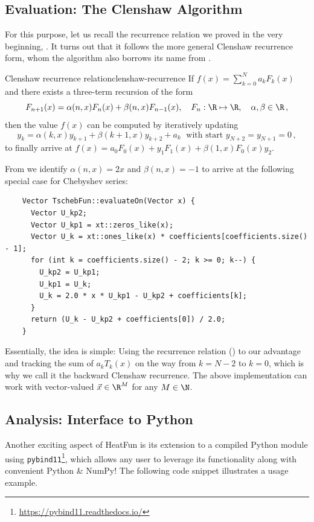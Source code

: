 \documentclass[12pt, a4paper]{article}
\newcommand{\chebyshev}{Chebyshev\xspace}
\newcommand{\heatfun}{\textcolor{themecolor3}{HeatFun}\xspace}
\begin{document}
  \subsection{Evaluation: The Clenshaw Algorithm}
  For this purpose, let us recall the recurrence relation we proved in the very beginning, .
  It turns out that it follows the more general Clenshaw recurrence form, whom the algorithm also borrows its name from \parencite[172-178]{art-of-sci-comp}.
  \begin{theorem}{Clenshaw recurrence relation}{clenshaw-recurrence}
    If $f(x) = \sum_{k=0}^N a_k F_k(x)$ and there exists a three-term recursion of the form
    $$F_{n+1}(x)=\alpha(n,x) F_n(x) + \beta(n,x) F_{n-1}(x),\quad F_n: \R \mapsto \R, \quad \alpha, \beta \in \R \,,$$
    then the value $f(x)$ can be computed by iteratively updating
    $$y_k = \alpha(k,x)y_{k+1}+\beta(k+1,x)y_{k+2}+a_k \; \text{ with start } y_{N+2} = y_{N+1} = 0\,,$$
    to finally arrive at $f(x) = a_0F_0(x)+y_1F_1(x)+\beta(1,x)F_0(x)y_2$.
  \end{theorem}

  From  we identify $\alpha(n, x) = 2x$ and $\beta(n, x) = -1$ to arrive at the following special case for \chebyshev series:
  \begin{verbatim}
    Vector TschebFun::evaluateOn(Vector x) {
      Vector U_kp2;
      Vector U_kp1 = xt::zeros_like(x);
      Vector U_k = xt::ones_like(x) * coefficients[coefficients.size() - 1];
      for (int k = coefficients.size() - 2; k >= 0; k--) {
        U_kp2 = U_kp1;
        U_kp1 = U_k;
        U_k = 2.0 * x * U_kp1 - U_kp2 + coefficients[k];
      }
      return (U_k - U_kp2 + coefficients[0]) / 2.0;
    }
  \end{verbatim}

  Essentially, the idea is simple: Using the recurrence relation () to our advantage and tracking the sum of $a_k T_k(x)$ on the way from $k = N-2$ to $k=0$, which is why we call it the backward Clenshaw recurrence.
  The above implementation can work with vector-valued $\vec{x} \in \R^M$ for any $M \in \N$.

  \subsection{Analysis: Interface to Python}
  Another exciting aspect of \heatfun is its extension to a compiled Python module using \texttt{pybind11}\footnote{\url{https://pybind11.readthedocs.io/}}, which allows any user to leverage its functionality along with convenient Python \& NumPy! The following code snippet illustrates a usage example.
\end{document}
